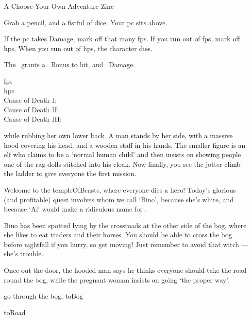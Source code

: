 \documentclass[10pt,twoside]{book}
\begin{document}
%
  {
    \vfill
    A Choose-Your-Own Adventure Zine
  }

{
  \toggletrue{allyCharacter}
  \small
  \shortsword
  \noindent
  Grab a pencil, and a fistful of dice.
  Your \gls{pc} sits above.

  If the \gls{pc} takes Damage, mark off that many \glspl{fp}.
  If you run out of \glspl{fp}, mark off \glspl{hp}.
  When you run out of \glspl{hp}, the character dies.

  The \weaponName\ grants a ~Bonus to hit, and ~Damage.


  \begin{description}
    \item[\Glspl{fp}]
    \fpStat
    \item[\Glspl{hp}]
    \hpStat
    \item[Cause of Death I:]
    \bigLine
    \item[Cause of Death II:]
    \bigLine
    \item[Cause of Death III:]
    \bigLine
  \end{description}

}

\pagebreak
\pagestyle{minizine}

while rubbing her own lower back.
A man stands by her side, with a massive hood covering his head, and a wooden staff in his hands.
The smaller figure is an elf who claims to be a `normal human child' and then insists on showing people one of the rag-dolls stitched into his cloak.
Now finally, you see the \gls{jotter} climb the ladder to give everyone the first mission.

\begin{speechtext}
  Welcome to the \gls{templeOfBeasts}, where everyone dies a hero!
  Today's glorious (and profitable) quest involves  whom we call `Bino', because she's white, and because `Al' would make a ridiculous name for .

  Bino has been spotted lying by the crossroads at the other side of the bog, where she likes to eat traders and their horses.
  You should be able to cross the bog before nightfall if you hurry, so get moving!
  Just remember to avoid that \gls{witch} --- she's trouble.
\end{speechtext}

Once out the door, the hooded man says he thinks everyone should take the road round the bog, while the pregnant woman insists on going `the proper way'.

\begin{selectPath}
  {go through the bog.}%
  {toBog}

  {}%
  {toRoad}
\end{selectPath}
\end{document}
